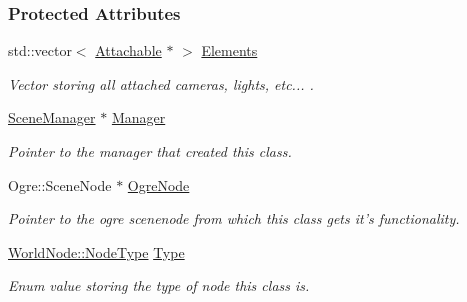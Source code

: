 \subsubsection*{Protected Attributes}
\begin{DoxyCompactItemize}
\item 
\hypertarget{classMezzanine_1_1WorldNode_a220b3039234945c8c79a47d153b3c4ef}{
std::vector$<$ \hyperlink{classMezzanine_1_1Attachable}{Attachable} $\ast$ $>$ \hyperlink{classMezzanine_1_1WorldNode_a220b3039234945c8c79a47d153b3c4ef}{Elements}}
\label{classMezzanine_1_1WorldNode_a220b3039234945c8c79a47d153b3c4ef}

\begin{DoxyCompactList}\small\item\em Vector storing all attached cameras, lights, etc... . \item\end{DoxyCompactList}\item 
\hypertarget{classMezzanine_1_1WorldNode_a99c96cab509b8e8d68d888beea424046}{
\hyperlink{classMezzanine_1_1SceneManager}{SceneManager} $\ast$ \hyperlink{classMezzanine_1_1WorldNode_a99c96cab509b8e8d68d888beea424046}{Manager}}
\label{classMezzanine_1_1WorldNode_a99c96cab509b8e8d68d888beea424046}

\begin{DoxyCompactList}\small\item\em Pointer to the manager that created this class. \item\end{DoxyCompactList}\item 
\hypertarget{classMezzanine_1_1WorldNode_a5ff677facd647d3bd49662e5bc916f54}{
Ogre::SceneNode $\ast$ \hyperlink{classMezzanine_1_1WorldNode_a5ff677facd647d3bd49662e5bc916f54}{OgreNode}}
\label{classMezzanine_1_1WorldNode_a5ff677facd647d3bd49662e5bc916f54}

\begin{DoxyCompactList}\small\item\em Pointer to the ogre scenenode from which this class gets it's functionality. \item\end{DoxyCompactList}\item 
\hypertarget{classMezzanine_1_1WorldNode_a39b4ed5cf8e81dd0a3b8b1d41220d4e2}{
\hyperlink{classMezzanine_1_1WorldNode_a7b41cfe149e688905e56fb395d6a2493}{WorldNode::NodeType} \hyperlink{classMezzanine_1_1WorldNode_a39b4ed5cf8e81dd0a3b8b1d41220d4e2}{Type}}
\label{classMezzanine_1_1WorldNode_a39b4ed5cf8e81dd0a3b8b1d41220d4e2}

\begin{DoxyCompactList}\small\item\em Enum value storing the type of node this class is. \item\end{DoxyCompactList}\end{DoxyCompactItemize}


